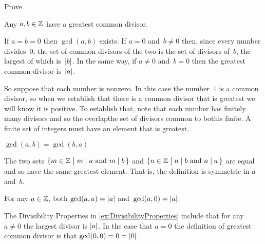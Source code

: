 \documentclass{ibl}  %
\begin{document}
\begin{problem}
Prove.
\begin{exes} 
\begin{exercise}  
   Any $a,b\in\mathbb{Z}$ have a greatest common divisor.
\end{exercise}
\begin{answer}
  If $a=b=0$ then $\gcd(a,b)$ exists. 
  If $a=0$ and~$b\neq 0$ then, since every number divides~$0$, the set of 
  common divisors of the two is the set of divisors of~$b$, 
  the largest of which is~$\lvert b\rvert$.
  In the same way, if $a\neq 0$ and~$b=0$ then the greatest common divisor 
  is~$\lvert a\rvert$.

  So suppose that each number is nonzero.
  In this case the number~$1$ is a common divisor, so when we establish that 
  there is a common divisor that is greatest we will know it is positive.
  To establish that, note that each number has finitely many divisors and
  so the overlap\Dash the set of divisors common to both\Dash is finite.
  A finite set of integers must have an element that is greatest.  
\end{answer}
\begin{exercise}  
  $\gcd(a,b)=\gcd(b,a)$
\end{exercise}
\begin{answer}
  The two sets 
  $\{m\in\mathbb{Z} \bigm| \text{$m\mid a$ and $m\mid b$\,}\}$
  and 
  $\{n\in\mathbb{Z} \bigm| \text{$n\mid b$ and $n\mid a$\,}\}$
  are equal and so have the same greatest element. 
  That is, the definition is symmetric in $a$ and~$b$.  
\end{answer}
\begin{exercise} 
  For any $a\in\mathbb{Z}$, both $\gcd(a,a)=\lvert a\rvert$ 
  and~$\gcd(a,0)=\lvert a\rvert$.
\end{exercise}
\begin{answer}
  The Divisibility Properties in \ref{ex:DivisibilityProperties}
  include that for any~$a\neq 0$ the largest divisor is $\lvert a\rvert$.
  In the case that $a=0$ the definition of greatest common divisor 
  is that $\gcd(0,0)=0=\lvert0\rvert$.


\end{answer}
\end{exes}
\end{problem}
\end{document}
